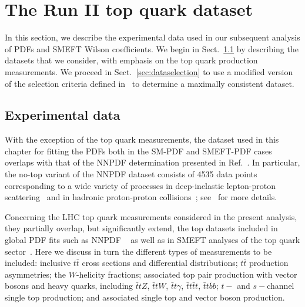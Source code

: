 \documentclass[withindex,glossary]{cam-thesis}
\begin{document}
\section{The Run II top quark dataset}
\label{sec:exp}

In this section, we describe the experimental data used in our subsequent analysis of PDFs and SMEFT Wilson coefficients. We begin in Sect.~\ref{sec:baseline_data} by 
describing the datasets that we consider, with
emphasis on the top quark production measurements. We proceed in Sect.~\ref{sec:dataselection} 
to use a modified version of the selection criteria
defined in~\cite{NNPDF:2021njg}
to determine a maximally consistent dataset.

\subsection{Experimental data}
\label{sec:baseline_data}

With the exception of the top quark measurements, the dataset used in
this chapter for fitting the PDFs both in the SM-PDF and SMEFT-PDF cases
overlaps with that of the NNPDF determination presented in Ref.~\cite{NNPDF:2021njg}.
%
In particular,
the no-top variant of the NNPDF dataset consists of 4535 data points
corresponding to a wide variety of processes in
deep-inelastic lepton-proton scattering~\cite{Arneodo:1996kd,Arneodo:1996qe,Whitlow:1991uw,Benvenuti:1989rh,Onengut:2005kv,Goncharov:2001qe,MasonPhD,Abramowicz:2015mha,H1:2018flt}
and in hadronic proton-proton collisions~\cite{Moreno:1990sf,Webb:2003ps,Towell:2001nh,Aaltonen:2010zza,Abazov:2007jy,Abazov:2013rja,D0:2014kma,Abulencia:2007ez,Aad:2011dm,Aaboud:2016btc,Aad:2014qja,Aad:2013iua,Chatrchyan:2012xt,Chatrchyan:2013mza,Chatrchyan:2013tia,Khachatryan:2016pev, Aaij:2012mda,Aaij:2015gna,Aaij:2015vua,Aaij:2015zlq,Aad:2016zzw,Aaboud:2017ffb,Aad:2019rou,Aaij:2016qqz,Aad:2016naf,Aaij:2016mgv,Aad:2015auj,Khachatryan:2015oaa, Aaboud:2017soa, Sirunyan:2017wgx,Aad:2011fc,Aad:2013lpa,Aad:2014vwa,Chatrchyan:2012bja,Khachatryan:2015luy,Aaboud:2017dvo,Khachatryan:2016mlc,Aad:2016xcr,ATLAS:2017nah}; see~\cite{NNPDF:2021njg}
for more details.

Concerning the LHC top quark measurements considered in the present
analysis,
they partially overlap, but significantly extend, the top datasets included in
global PDF fits such as NNPDF ~\cite{NNPDF:2021njg} as well as in SMEFT analyses of the top quark sector~\cite{Ellis:2020unq,Ethier:2021bye}.
%
Here we discuss in turn the different types of measurements to be included: inclusive $t\bar{t}$ cross sections and differential distributions; $t\bar{t}$ production asymmetries; the $W$-helicity fractions;
 associated top pair production with vector bosons and heavy quarks, including $\bar{t}t Z$, $\bar{t}t W$, $\bar{t}t \gamma$, $\bar{t}t\bar{t}t$, $\bar{t}t\bar{b}b$;
 $t-$ and $s-$channel single top production;
 and associated single top and vector boson production.
\end{document}
